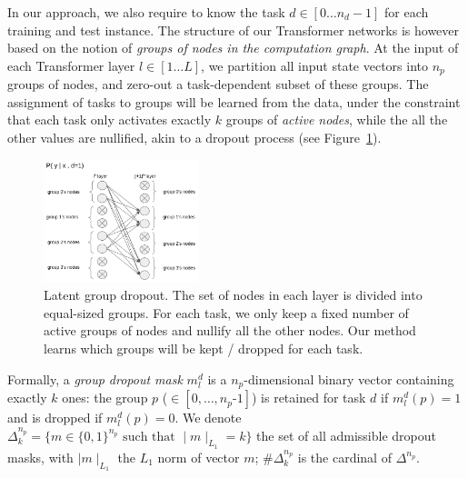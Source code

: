 \documentclass[11pt]{article}
\newcommand{\fyDone}[1]{\done[FY]\Todo[FY:]{\textcolor{orange}{#1}}}
\begin{document}
In our approach, we also require to know the task $d \in [0 \dots n_d-1]$ for each training and test instance. The structure of our Transformer networks \citep{Vaswani17attention} is however based on the notion of \emph{groups of nodes in the computation graph}. At the input of each Transformer layer $l \in [1 \dots L]$, we partition all input state vectors into $n_p$ groups of nodes, and zero-out a task-dependent subset of these groups.\fyDone{In the attention heads only? In the FF?} The assignment of tasks to groups will be learned from the data, under the constraint that each task only activates exactly $k$ groups of \emph{active nodes}, while the all the other values are nullified, akin to a dropout process (see Figure~\ref{fig:group_dropout}).
\begin{figure}
  \centering
\includegraphics[width=0.4\textwidth]{group_dropout}
\caption{Latent group dropout. The set of nodes\fyDone{parameters ?} in each layer is divided into equal-sized groups. For each task, we only keep a fixed number of active groups of nodes and nullify all the other nodes. Our method learns which groups will be kept / dropped for each task.}
\label{fig:group_dropout}
\end{figure}
Formally, a \emph{group dropout mask} $m_l^d$ is a $n_p$-dimensional binary vector containing exactly $k$ ones: the group $p$ ($\in  [0,\dots,n_p\text{-}1]$) is retained for task $d$ if $m_l^d(p) =1$ and is dropped if $m_l^d(p) = 0$. We denote $\Delta^{n_p}_k = \{ m \in \{0,1\}^{n_p} \text{ such that }  \mid{} m \mid_{L_1} = k \}$ the set of all admissible dropout masks, with $\mid{} m \mid_{L_1}$ the $L_1$ norm of vector $m$; $\#\Delta^{n_p}_k$ is the cardinal of $\Delta^{n_p}$.
\end{document}

